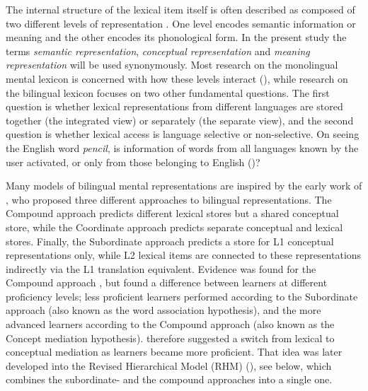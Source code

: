 \documentclass[output=paper,colorlinks,citecolor=brown,nonflat]{langsci/langscibook}
\begin{document}
The internal structure of the lexical item itself is often described as composed of two different levels of representation \citep{Levelt1989}. One level encodes semantic information or meaning and the other encodes its phonological form. In the present study the terms \textit{semantic representation}, \textit{conceptual representation} and \textit{meaning representation} will be used synonymously. Most research on the monolingual mental lexicon is concerned with how these levels interact (\citealt{DellOSeaghdha1991, LeveltEtAl1991Picture, LeveltEtAl1991Reply, DellOSeaghdha1992, Levelt1992}), while research on the bilingual lexicon focuses on two other fundamental questions. The first question is whether lexical representations from different languages are stored together (the integrated view) or separately (the separate view), and the second question is whether lexical access is language selective or non-selective. On seeing the English word \textit{pencil}, is information of words from all languages known by the user activated, or only from those belonging to English (\citealt{Weinreich1953, SánchezCasasEtAl1992, Poulisse1997, DijkstraVanHeuven1998, VanHeuvenEtAl1998, DijkstraVanHeuven2002, Dijkstra2003, LemhöferDijkstra2004, LemhöferEtAl2004, Costa2005, Dijkstra2005, KrollDeGroot2005, LaHeij2005, DijkstraEtAl2010, KrollEtAl2010, VanHeuvenEtAl2011, DeAngelisEtAl2015})?

Many models of bilingual mental representations are inspired by the early work of \citet{Weinreich1953}, who proposed three different approaches to bilingual representations. The Compound approach predicts different lexical stores but a shared conceptual store, while the Coordinate approach predicts separate conceptual and lexical stores. Finally, the Subordinate approach predicts a store for L1 conceptual representations only, while L2 lexical items are connected to these representations indirectly via the L1 translation equivalent. Evidence was found for the Compound approach \citep{PotterEtAl1984}, but \citet{KrollCurley1988} found a difference between learners at different proficiency levels; less proficient learners performed according to the Subordinate approach (also known as the word association hypothesis), and the more advanced learners according to the Compound approach (also known as the Concept mediation hypothesis). \citeauthor{KrollCurley1988} therefore suggested a switch from lexical to conceptual mediation as learners became more proficient. That idea was later developed into the Revised Hierarchical Model (RHM) (\citealt{KrollStewart1994, KrollEtAl2010}), see  below, which combines the subordinate- and the compound approaches into a single one.
\end{document}
